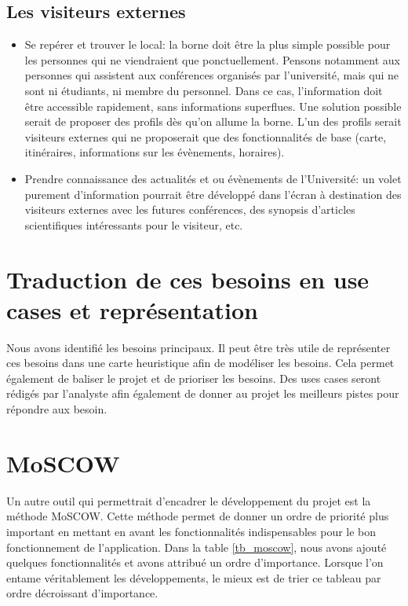 \subsection{Les visiteurs externes}
\begin{itemize}
    \item {Se repérer et trouver le local}: la borne doit être la plus simple possible pour les personnes qui ne viendraient que ponctuellement. Pensons notamment aux personnes qui assistent aux conférences organisés par l'université, mais qui ne sont ni étudiants, ni membre du personnel. Dans ce cas, l'information doit être accessible rapidement, sans informations superflues. Une solution possible serait de proposer des profils dès qu'on allume la borne. L'un des profils serait visiteurs externes qui ne proposerait que des fonctionnalités de base (carte, itinéraires, informations sur les évènements, horaires). 
\item {Prendre connaissance des actualités et ou évènements de l'Université}: un volet purement d'information pourrait être développé dans l'écran à destination des visiteurs externes avec les futures conférences, des synopsis d'articles scientifiques intéressants pour le visiteur, etc. 
\end{itemize}

\section{Traduction de ces besoins en use cases et représentation}
Nous avons identifié les besoins principaux. Il peut être très utile de représenter ces besoins dans une carte heuristique afin de modéliser les besoins. Cela permet également de baliser le projet et de prioriser les besoins. Des uses cases seront rédigés par l'analyste afin également de donner au projet les meilleurs pistes pour répondre aux besoin. 

\section{MoSCOW}
Un autre outil qui permettrait d'encadrer le développement du projet est la méthode MoSCOW. Cette méthode permet de donner un ordre de priorité plus important en mettant en avant les fonctionnalités indispensables pour le bon fonctionnement de l'application. Dans la table \ref{tb_moscow}, nous avons ajouté quelques fonctionnalités et avons attribué un ordre d'importance. Lorsque l'on entame véritablement les développements, le mieux est de trier ce tableau par ordre décroissant d'importance. 

\begin{table}[H] \label{tb_moscow}

\end{table}